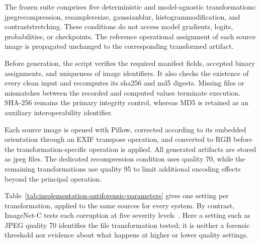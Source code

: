The frozen suite comprises five deterministic and model-agnostic
transformations: \gls{jpegrecompression}, \gls{resampleresize},
\gls{gaussianblur}, \gls{histogrammodification}, and
\gls{contraststretching}. These conditions do not access model gradients,
logits, probabilities, or checkpoints. The reference operational assignment of
each source image is propagated unchanged to the corresponding transformed
artifact.

Before generation, the script verifies the required manifest fields, accepted
binary assignments, and uniqueness of image identifiers. It also checks the
existence of every clean input and recomputes its \gls{sha256} and \gls{md5}
digests. Missing files or mismatches between the recorded and computed values
terminate execution. SHA-256 remains the primary integrity control, whereas
MD5 is retained as an auxiliary interoperability identifier.

Each source image is opened with Pillow, corrected according to its embedded
orientation through an EXIF transpose operation, and converted to RGB before
the transformation-specific operation is applied. All generated artifacts are
stored as \gls{jpeg} files. The dedicated recompression condition uses quality
70, while the remaining transformations use quality 95 to limit additional
encoding effects beyond the principal operation.

Table~\ref{tab:implementation-antiforensic-parameters} gives one setting per
transformation, applied to the same sources for every system. By contrast,
ImageNet-C tests each corruption at five severity levels~\cite{hendrycks2019benchmarking}.
Here a setting such as JPEG quality 70 identifies the file transformation
tested; it is neither a forensic threshold nor evidence about what happens
at higher or lower quality settings.

